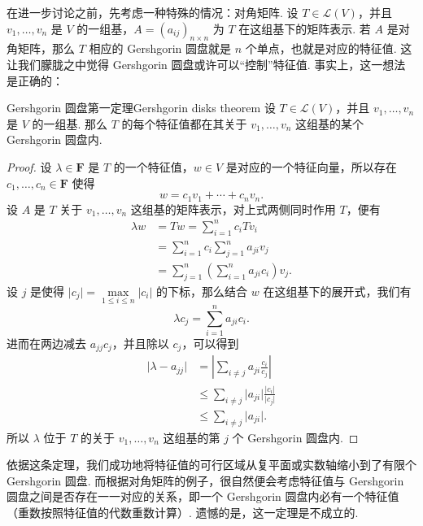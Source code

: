 在进一步讨论之前，先考虑一种特殊的情况：对角矩阵. 设 $T \in \mathcal{L}(V)$，并且 $v_1, \ldots, v_n$ 是 $V$ 的一组基，$A = (a_{ij})_{n \times n}$ 为 $T$ 在这组基下的矩阵表示. 若 $A$ 是对角矩阵，那么 $T$ 相应的 Gershgorin 圆盘就是 $n$ 个单点，也就是对应的特征值. 这让我们朦胧之中觉得 Gershgorin 圆盘或许可以``控制''特征值. 事实上，这一想法是正确的：

\begin{theorem}{Gershgorin 圆盘第一定理}{Gershgorin disks theorem}
    设 $T \in \mathcal{L}(V)$，并且 $v_1, \ldots, v_n$ 是 $V$ 的一组基. 那么 $T$ 的每个特征值都在其关于 $v_1, \ldots, v_n$ 这组基的某个 Gershgorin 圆盘内.
\end{theorem}

\begin{proof}
    设 $\lambda \in \mathbf{F}$ 是 $T$ 的一个特征值，$w \in V$ 是对应的一个特征向量，所以存在 $c_1,\ldots, c_n \in \mathbf{F}$ 使得
    \[
        w = c_1 v_1 + \cdots + c_n v_n.
    \]
    设 $A$ 是 $T$ 关于 $v_1, \ldots, v_n$ 这组基的矩阵表示，对上式两侧同时作用 $T$，便有
    \begin{align*}
        \lambda w & = Tw = \sum_{i = 1}^n c_i T v_i                                \\
                  & = \sum_{i = 1}^n c_i \sum_{j = 1}^n a_{ji} v_j                 \\
                  & = \sum_{j = 1}^n \left( \sum_{i = 1}^n a_{ji} c_i \right) v_j.
    \end{align*}
    设 $j$ 是使得 $\lvert c_j \rvert = \max\limits_{1 \leqslant i \leqslant n} \lvert c_i \rvert$ 的下标，那么结合 $w$ 在这组基下的展开式，我们有
    \[
        \lambda c_j = \sum_{i = 1}^n a_{ji} c_i.
    \]
    进而在两边减去 $a_{jj} c_j$，并且除以 $c_j$，可以得到
    \begin{align*}
        \lvert \lambda - a_{jj} \rvert & = \left\lvert \sum_{i \neq j} a_{ji} \frac{c_i}{c_j} \right\rvert                          \\
                                       & \leqslant \sum_{i \neq j} \lvert a_{ji} \rvert \frac{\lvert c_i \rvert}{\lvert c_j \rvert} \\
                                       & \leqslant \sum_{i \neq j} \lvert a_{ji} \rvert.
    \end{align*}
    所以 $\lambda$ 位于 $T$ 的关于 $v_1, \ldots, v_n$ 这组基的第 $j$ 个 Gershgorin 圆盘内.
\end{proof}

依据这条定理，我们成功地将特征值的可行区域从复平面或实数轴缩小到了有限个 Gershgorin 圆盘. 而根据对角矩阵的例子，很自然便会考虑特征值与 Gershgorin 圆盘之间是否存在一一对应的关系，即一个 Gershgorin 圆盘内必有一个特征值（重数按照特征值的代数重数计算）. 遗憾的是，这一定理是不成立的.

